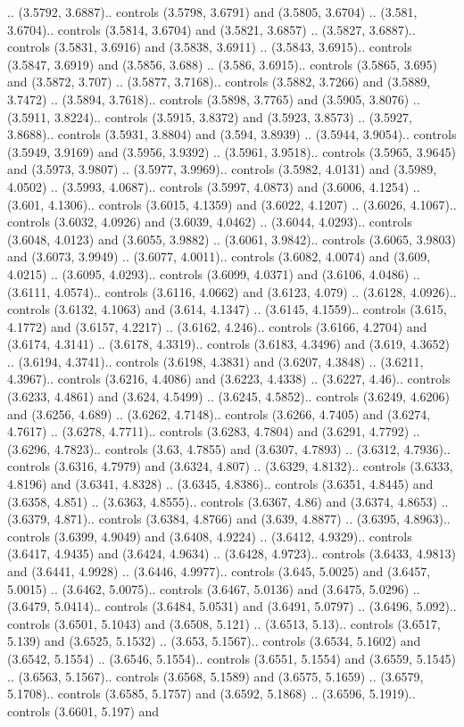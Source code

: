.. (3.5792, 3.6887).. controls (3.5798, 3.6791) and (3.5805, 3.6704) .. (3.581, 3.6704).. controls (3.5814, 3.6704) and (3.5821, 3.6857) .. (3.5827, 3.6887).. controls (3.5831, 3.6916) and (3.5838, 3.6911) .. (3.5843, 3.6915).. controls (3.5847, 3.6919) and (3.5856, 3.688) .. (3.586, 3.6915).. controls (3.5865, 3.695) and (3.5872, 3.707) .. (3.5877, 3.7168).. controls (3.5882, 3.7266) and (3.5889, 3.7472) .. (3.5894, 3.7618).. controls (3.5898, 3.7765) and (3.5905, 3.8076) .. (3.5911, 3.8224).. controls (3.5915, 3.8372) and (3.5923, 3.8573) .. (3.5927, 3.8688).. controls (3.5931, 3.8804) and (3.594, 3.8939) .. (3.5944, 3.9054).. controls (3.5949, 3.9169) and (3.5956, 3.9392) .. (3.5961, 3.9518).. controls (3.5965, 3.9645) and (3.5973, 3.9807) .. (3.5977, 3.9969).. controls (3.5982, 4.0131) and (3.5989, 4.0502) .. (3.5993, 4.0687).. controls (3.5997, 4.0873) and (3.6006, 4.1254) .. (3.601, 4.1306).. controls (3.6015, 4.1359) and (3.6022, 4.1207) .. (3.6026, 4.1067).. controls (3.6032, 4.0926) and (3.6039, 4.0462) .. (3.6044, 4.0293).. controls (3.6048, 4.0123) and (3.6055, 3.9882) .. (3.6061, 3.9842).. controls (3.6065, 3.9803) and (3.6073, 3.9949) .. (3.6077, 4.0011).. controls (3.6082, 4.0074) and (3.609, 4.0215) .. (3.6095, 4.0293).. controls (3.6099, 4.0371) and (3.6106, 4.0486) .. (3.6111, 4.0574).. controls (3.6116, 4.0662) and (3.6123, 4.079) .. (3.6128, 4.0926).. controls (3.6132, 4.1063) and (3.614, 4.1347) .. (3.6145, 4.1559).. controls (3.615, 4.1772) and (3.6157, 4.2217) .. (3.6162, 4.246).. controls (3.6166, 4.2704) and (3.6174, 4.3141) .. (3.6178, 4.3319).. controls (3.6183, 4.3496) and (3.619, 4.3652) .. (3.6194, 4.3741).. controls (3.6198, 4.3831) and (3.6207, 4.3848) .. (3.6211, 4.3967).. controls (3.6216, 4.4086) and (3.6223, 4.4338) .. (3.6227, 4.46).. controls (3.6233, 4.4861) and (3.624, 4.5499) .. (3.6245, 4.5852).. controls (3.6249, 4.6206) and (3.6256, 4.689) .. (3.6262, 4.7148).. controls (3.6266, 4.7405) and (3.6274, 4.7617) .. (3.6278, 4.7711).. controls (3.6283, 4.7804) and (3.6291, 4.7792) .. (3.6296, 4.7823).. controls (3.63, 4.7855) and (3.6307, 4.7893) .. (3.6312, 4.7936).. controls (3.6316, 4.7979) and (3.6324, 4.807) .. (3.6329, 4.8132).. controls (3.6333, 4.8196) and (3.6341, 4.8328) .. (3.6345, 4.8386).. controls (3.6351, 4.8445) and (3.6358, 4.851) .. (3.6363, 4.8555).. controls (3.6367, 4.86) and (3.6374, 4.8653) .. (3.6379, 4.871).. controls (3.6384, 4.8766) and (3.639, 4.8877) .. (3.6395, 4.8963).. controls (3.6399, 4.9049) and (3.6408, 4.9224) .. (3.6412, 4.9329).. controls (3.6417, 4.9435) and (3.6424, 4.9634) .. (3.6428, 4.9723).. controls (3.6433, 4.9813) and (3.6441, 4.9928) .. (3.6446, 4.9977).. controls (3.645, 5.0025) and (3.6457, 5.0015) .. (3.6462, 5.0075).. controls (3.6467, 5.0136) and (3.6475, 5.0296) .. (3.6479, 5.0414).. controls (3.6484, 5.0531) and (3.6491, 5.0797) .. (3.6496, 5.092).. controls (3.6501, 5.1043) and (3.6508, 5.121) .. (3.6513, 5.13).. controls (3.6517, 5.139) and (3.6525, 5.1532) .. (3.653, 5.1567).. controls (3.6534, 5.1602) and (3.6542, 5.1554) .. (3.6546, 5.1554).. controls (3.6551, 5.1554) and (3.6559, 5.1545) .. (3.6563, 5.1567).. controls (3.6568, 5.1589) and (3.6575, 5.1659) .. (3.6579, 5.1708).. controls (3.6585, 5.1757) and (3.6592, 5.1868) .. (3.6596, 5.1919).. controls (3.6601, 5.197) and 